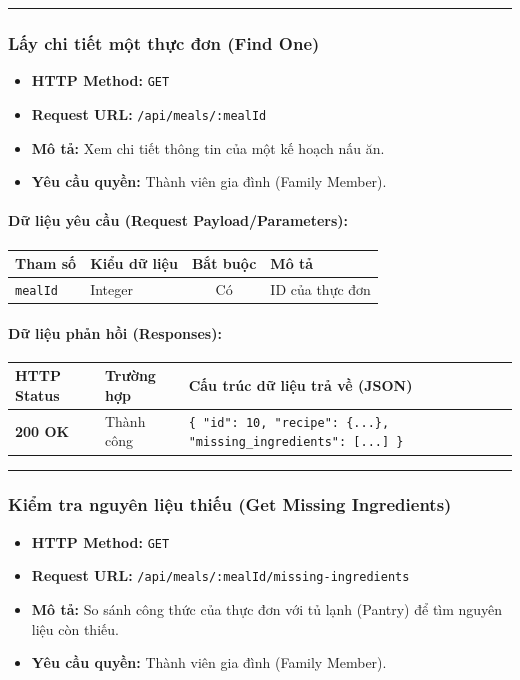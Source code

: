 \documentclass[12pt,a4paper]{article}
\begin{document}
\vskip 0.4cm
\noindent\rule{\textwidth}{0.3pt}
\vskip 0.4cm

\subsubsection{Lấy chi tiết một thực đơn (Find One)}
\begin{itemize}[leftmargin=*]
    \item \textbf{HTTP Method:} \texttt{GET}
    \item \textbf{Request URL:} \texttt{/api/meals/:mealId}
    \item \textbf{Mô tả:} Xem chi tiết thông tin của một kế hoạch nấu ăn.
    \item \textbf{Yêu cầu quyền:} Thành viên gia đình (Family Member).
\end{itemize}

\paragraph{Dữ liệu yêu cầu (Request Payload/Parameters):}
\begin{longtable}{|p{2.8cm}|p{2.2cm}|c|p{7.0cm}|}
\hline
\textbf{Tham số} & \textbf{Kiểu dữ liệu} & \textbf{Bắt buộc} & \textbf{Mô tả} \\ \hline
\endhead
\texttt{mealId} & Integer & Có & ID của thực đơn \\ \hline
\end{longtable}

\paragraph{Dữ liệu phản hồi (Responses):}
\begin{longtable}{|p{2.8cm}|p{3.2cm}|p{8.0cm}|}
\hline
\textbf{HTTP Status} & \textbf{Trường hợp} & \textbf{Cấu trúc dữ liệu trả về (JSON)} \\ \hline
\endhead
\textbf{200 OK} & Thành công & \texttt{\{ "id": 10, "recipe": \{...\}, "missing\_ingredients": [...] \}} \\ \hline
\end{longtable}

\vskip 0.4cm
\noindent\rule{\textwidth}{0.3pt}
\vskip 0.4cm

\subsubsection{Kiểm tra nguyên liệu thiếu (Get Missing Ingredients)}
\begin{itemize}[leftmargin=*]
    \item \textbf{HTTP Method:} \texttt{GET}
    \item \textbf{Request URL:} \texttt{/api/meals/:mealId/missing-ingredients}
    \item \textbf{Mô tả:} So sánh công thức của thực đơn với tủ lạnh (Pantry) để tìm nguyên liệu còn thiếu.
    \item \textbf{Yêu cầu quyền:} Thành viên gia đình (Family Member).
\end{itemize}
\end{document}
